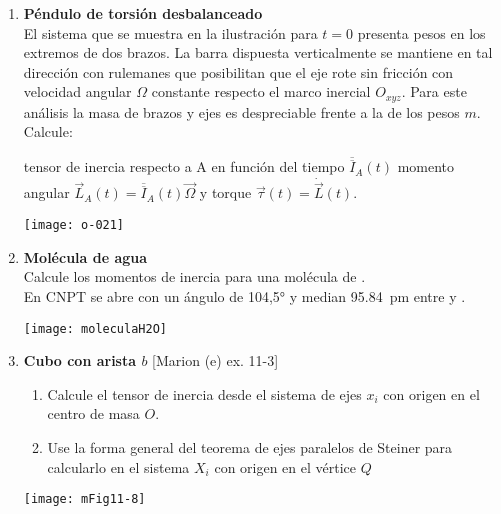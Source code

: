 \documentclass[11pt, spanish, a4paper, twoside]{article}
\begin{document}
\begin{enumerate}
	\item 
	\begin{minipage}[t][5.5cm]{0.65\textwidth}
		\textbf{Péndulo de torsión desbalanceado}\\
		El sistema que se muestra en la ilustración para \(t=0\) presenta pesos en los extremos de dos brazos.
		La barra dispuesta verticalmente se mantiene en tal dirección con rulemanes que posibilitan que el eje rote sin fricción con velocidad angular $\Omega$ constante respecto el marco inercial $O_{xyz}$.
		Para este análisis la masa de brazos y ejes es despreciable frente a la de los pesos \(m\).
		Calcule: 
		\begin{tasks} 
			\task tensor de inercia respecto a A en función del tiempo \(\overline{\overline{I}}_A(t)\) 
			\task momento angular $\vec{L}_A (t) = \overline{\overline{I}}_A (t) \vec{\Omega}$ y torque $\vec{\tau} (t) = \dot{\vec{L}} (t)$.
		\end{tasks}
	\end{minipage}
	\begin{minipage}[c][0cm][t]{0.3\textwidth}
		\texttt{[image: o-021]}
	\end{minipage}


	\item 
	\begin{minipage}[t][2.5cm]{0.75\textwidth}
		\textbf{Molécula de agua}\\
		Calcule los momentos de inercia para una molécula de .\\
		En CNPT se abre con un ángulo de \ang{104,5;;} y median \SI{95.84}{\pico\metre} entre  y .
	\end{minipage}
	\begin{minipage}[c][2cm][t]{0.2\textwidth}
		\texttt{[image: moleculaH2O]}
	\end{minipage}



	\item 
	\begin{minipage}[t][4.5cm]{0.55\textwidth}
			\textbf{Cubo con arista \(b\)} [Marion (e) ex. 11-3]
			\begin{enumerate}
				\item Calcule el tensor de inercia desde el sistema de ejes \(x_i\) con origen en el centro de masa \(O\).
				\item Use la forma general del teorema de ejes paralelos de Steiner para calcularlo en el sistema \(X_i\) con origen en el vértice \(Q\) 
			\end{enumerate}
		\end{minipage}
		\begin{minipage}[c][2.5cm][t]{0.4\textwidth}
			\texttt{[image: mFig11-8]}
		\end{minipage}



\end{enumerate}
\end{document}
